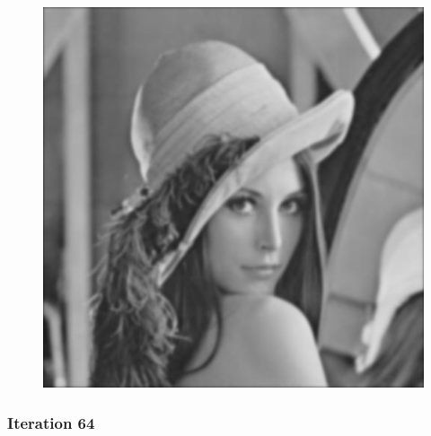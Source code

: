 \documentclass[11pt]{article}
\makeatletter
\def\maxwidth{\ifdim\Gin@nat@width>\linewidth\linewidth
    \else\Gin@nat@width\fi}
\let\Oldincludegraphics\includegraphics
\renewcommand{\includegraphics}[1]{\Oldincludegraphics[width=.8\maxwidth]{#1}}
\makeatother
\begin{document}
\begin{figure}[!htbp]
	\centering
	\includegraphics{"31th iterations_const"}
	\label{fig:31th-iterationsconst}
\end{figure}
\clearpage
    \hypertarget{iteration-64}{%
\subsubsection{Iteration 64}\label{iteration-64}}
\end{document}
